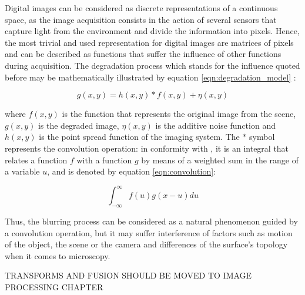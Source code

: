 {\color{red}
Digital images can be considered as discrete representations of a continuous space, as the image acquisition consists in the action of several sensors that capture light from the environment and divide the information into pixels. Hence, the most trivial and used representation for digital images are matrices of pixels and can be described as functions that suffer the influence of other functions during acquisition. The degradation process which stands for the influence quoted before may be mathematically illustrated by equation \ref{eqn:degradation_model} \cite{gonzalez2008digital}:

\begin{equation}
    \label{eqn:degradation_model}
      g(x,y) = h(x,y) \ast f(x,y) + \eta(x,y)
\end{equation}

\noindent where $f(x,y)$ is the function that represents the original image from the scene, $g(x,y)$ is the degraded image, $\eta(x,y)$ is the additive noise function and $h(x,y)$ is the point spread function of the imaging system. The $\ast$ symbol represents the convolution operation: in conformity with , it is an integral that relates a function $f$ with a function $g$ by means of a weighted sum in the range of a variable $u$, and is denoted by equation \ref{eqn:convolution}:

\begin{equation}
    \label{eqn:convolution}
      \int^{\infty}_{-\infty}f(u)g(x - u)du
\end{equation}
}

Thus, the blurring process can be considered as a natural phenomenon guided by a convolution operation, but it may suffer interference of factors such as motion of the object, the scene or the camera and differences of the surface's topology when it comes to microscopy. 


{\color{red} TRANSFORMS AND FUSION SHOULD BE MOVED TO IMAGE PROCESSING CHAPTER}




